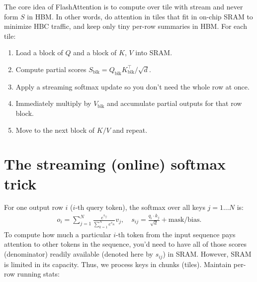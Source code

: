 The core idea of FlashAttention is to compute over tile with stream and never form $S$ in HBM. In other words, do attention in tiles that fit in on-chip SRAM to minimize HBC traffic, and keep only tiny per-row summaries in HBM. For each tile:

\begin{enumerate}
	\item Load a block of $Q$ and a block of $K$, $V$ into SRAM.
	\item Compute partial scores $S_{\text{blk}} = Q_{\text{blk}}K_{\text{blk}}^\top/\sqrt{d}$.
	\item Apply a streaming softmax update so you don't need the whole row at once.
	\item Immediately multiply by $V_{\text{blk}}$ and accumulate partial
		outputs for that row block.
	\item Move to the next block of $K/V$ and repeat.
\end{enumerate}

\section{The streaming (online) softmax trick}


For one output row $i$ ($i$-th query token), the softmax over all keys $j=1\ldots N$ is:
\begin{align*}
	o_i = \sum_{j=1}^N \frac{e^{s_{ij}}}{\sum_{k=1}^N e^{s_{ik}}} v_j,
	\quad s_{ij} = \frac{q_i\cdot k_j}{\sqrt{d}} + \text{mask/bias}.
\end{align*}
To compute how much a particular $i$-th token from the input sequence pays attention to other tokens in the sequence,  you'd need to have all of those scores (\ie denominator) readily available (denoted here by $s_{ij}$) in SRAM. However, SRAM is limited in its capacity. Thus, we process keys in chunks (\ie tiles). Maintain per-row running stats:

